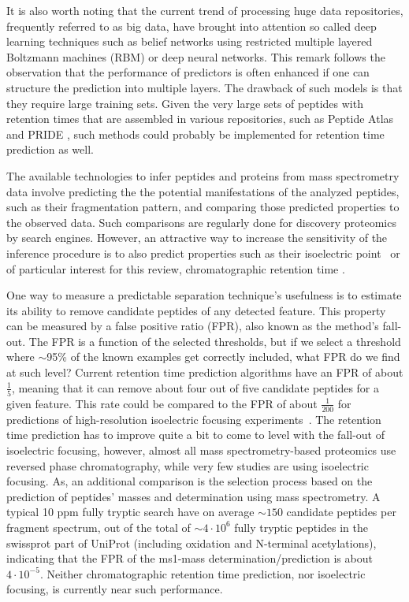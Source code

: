 \documentclass[a4paper]{article}
\begin{document}
It is also worth noting that the current trend of processing huge data
repositories, frequently referred to as big data, have brought into
attention so called deep learning techniques such as belief networks
using restricted multiple layered Boltzmann machines (RBM)
\cite{salakhutdinov2009deep} or deep neural networks. This remark
follows the observation that the performance of predictors is often
enhanced if one can structure the prediction into multiple layers. The
drawback of such models is that they require large training
sets. Given the very large sets of peptides with retention times that
are assembled in various repositories, such as Peptide Atlas
\cite{desiere2006peptideatlas} and PRIDE \cite{martens2005pride}, such
methods could probably be implemented for retention time prediction as
well.

The available technologies to infer peptides and proteins from mass
spectrometry data involve predicting the the potential manifestations
of the analyzed peptides, such as their fragmentation pattern, and
comparing those predicted properties to the observed data. Such
comparisons are regularly done for discovery proteomics by search
engines. However, an attractive way to increase the sensitivity of the
inference procedure is to also predict properties such as their
isoelectric point~\cite{perez2011silico,branca2014hirief} or of
particular interest for this review, chromatographic retention time
\cite{cerqueira2010mude}. 

One way to measure a predictable separation technique's usefulness is
to estimate its ability to remove candidate peptides of any detected
feature. This property can be measured by a false positive ratio
(FPR), also known as the method's fall-out. The FPR is a function of
the selected thresholds, but if we select a threshold where $\sim$95\%
of the known examples get correctly included, what FPR do we find at
such level?  Current retention time prediction algorithms have an FPR
of about $\frac{1}{5}$, meaning that it can remove about four out of
five candidate peptides for a given feature. This rate could be
compared to the FPR of about $\frac{1}{200}$ for predictions of
high-resolution isoelectric focusing
experiments~\cite{branca2014hirief}. The retention time prediction has
to improve quite a bit to come to level with the fall-out of
isoelectric focusing, however, almost all mass spectrometry-based
proteomics use reversed phase chromatography, while very few studies
are using isoelectric focusing. As, an additional comparison is the
selection process based on the prediction of peptides' masses and
determination using mass spectrometry. A typical 10 ppm fully tryptic
search have on average $\sim 150$ candidate peptides per fragment
spectrum, out of the total of $\sim 4\cdot 10^6$ fully tryptic
peptides in the swissprot part of UniProt (including oxidation and
N-terminal acetylations), indicating that the FPR of the ms1-mass
determination/prediction is about $4\cdot 10^{-5}$. Neither
chromatographic retention time prediction, nor isoelectric focusing,
is currently near such performance.
\end{document}
